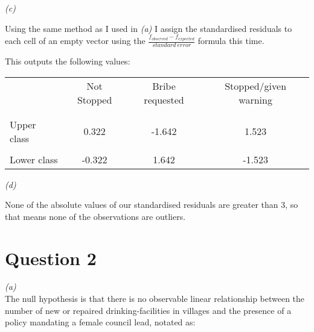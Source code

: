 \documentclass[12pt,letterpaper]{article}
\begin{document}
\vspace{.25cm}

\noindent\textit{(c)}\\ 

\vspace{.25cm}

\noindent Using the same method as I used in \textit{(a)} I assign the standardised residuals to each cell of an empty vector using the $\frac{f_{observed}-f_{expected}}{standard \: error}$ formula this time.

 

\noindent This outputs the following values:

\begin{table}[h]
	\centering
	\begin{tabular}{l | c c c }
		& Not Stopped & Bribe requested & Stopped/given warning \\
		\\[-1.8ex] 
		\hline \\[-1.8ex]
		Upper class  & 0.322 & -1.642 & 1.523 \\
		\\
		Lower class & -0.322 & 1.642  &  -1.523 \\
		
	\end{tabular}
\end{table}

\vspace{.25cm}

\noindent\textit{(d)}\\ 

\vspace{.25cm}

\noindent	None of the absolute values of our standardised residuals are greater than 3, so that means none of the observations are outliers. 

\clearpage

\section*{Question 2 }

\noindent\textit{(a)}\\ 

\noindent The null hypothesis is that there is no observable linear relationship between the number of new or repaired drinking-facilities in villages and the presence of a policy mandating a female council lead, notated as:
\end{document}
